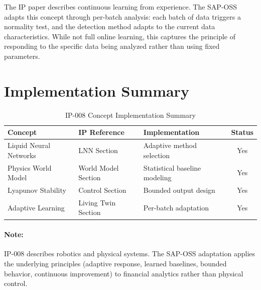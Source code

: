 \begin{adaptbox}
The IP paper describes continuous learning from experience. The SAP-OSS  adapts this concept through per-batch analysis: each batch of data triggers a normality test, and the detection method adapts to the current data characteristics. While not full online learning, this captures the principle of responding to the specific data being analyzed rather than using fixed parameters.
\end{adaptbox}

\section{Implementation Summary}

\begin{table}[H]
\centering
\caption{IP-008 Concept Implementation Summary}
\begin{tabularx}{\textwidth}{@{}p{3cm}p{3.5cm}Xc@{}}
\toprule
\textbf{Concept} & \textbf{IP Reference} & \textbf{Implementation} & \textbf{Status} \\
\midrule
Liquid Neural Networks & LNN Section & Adaptive method selection & Yes \\
Physics World Model & World Model Section & Statistical baseline modeling & Yes \\
Lyapunov Stability & Control Section & Bounded output design & Yes \\
Adaptive Learning & Living Twin Section & Per-batch adaptation & Yes \\
\bottomrule
\end{tabularx}
\end{table}

\paragraph{Note:}
IP-008 describes robotics and physical systems. The SAP-OSS adaptation applies the underlying principles (adaptive response, learned baselines, bounded behavior, continuous improvement) to financial analytics rather than physical control.